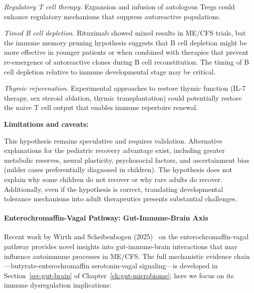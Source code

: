 \begin{hypothesis}
\textit{Regulatory T cell therapy.} Expansion and infusion of autologous Tregs could enhance regulatory mechanisms that suppress autoreactive populations.

\textit{Timed B cell depletion.} Rituximab showed mixed results in ME/CFS trials, but the immune memory pruning hypothesis suggests that B cell depletion might be more effective in younger patients or when combined with therapies that prevent re-emergence of autoreactive clones during B cell reconstitution. The timing of B cell depletion relative to immune developmental stage may be critical.

\textit{Thymic rejuvenation.} Experimental approaches to restore thymic function (IL-7 therapy, sex steroid ablation, thymic transplantation) could potentially restore the naive T cell output that enables immune repertoire renewal.

\textbf{Limitations and caveats:}

This hypothesis remains speculative and requires validation. Alternative explanations for the pediatric recovery advantage exist, including greater metabolic reserves, neural plasticity, psychosocial factors, and ascertainment bias (milder cases preferentially diagnosed in children). The hypothesis does not explain why some children do not recover or why rare adults do recover. Additionally, even if the hypothesis is correct, translating developmental tolerance mechanisms into adult therapeutics presents substantial challenges.
\end{hypothesis}

\paragraph{Enterochromaffin-Vagal Pathway: Gut-Immune-Brain Axis}

Recent work by Wirth and Scheibenbogen (2025)~\cite{WirthScheibenbogen2025Neurotransmitter} on the enterochromaffin-vagal pathway provides novel insights into gut-immune-brain interactions that may influence autoimmune processes in ME/CFS. The full mechanistic evidence chain---butyrate-enterochromaffin serotonin-vagal signaling---is developed in Section~\ref{sec:gut-brain} of Chapter~\ref{ch:gut-microbiome}; here we focus on its immune dysregulation implications:

